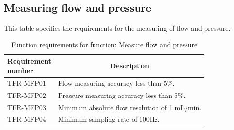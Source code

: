 \subsection{Measuring flow and pressure}
\begin{table} [H]
\caption{Function requirements for function: Measure flow and pressure}
\label{tab:funcmeas}
This table specifies the requirements for the measuring of flow and pressure.
\begin{tabular}{l|p{120mm}|}
	\makecell[l]{\textbf{Requirement} \\  \textbf{number}} & \multicolumn{1}{c}{\textbf{Description}}\\
	\hline
	TFR-MFP01 & Flow measuring accuracy less than 5\%. \\
	TFR-MFP02 & Pressure measuring accuracy less than 5\%. \\
	TFR-MFP03 & Minimum absolute flow resolution of 1 mL/min. \\
	TFR-MFP04 & Minimum sampling rate of 100Hz. \\
	\cline{2-2}
\end{tabular}
\raggedright
\end{table}

